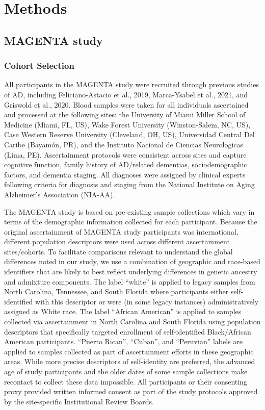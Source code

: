 \section{Methods}


\subsection{MAGENTA study}
\subsubsection*{Cohort Selection}
All participants in the MAGENTA study were recruited through previous studies of AD, including Feliciano-Astacio et al., 2019, Marca-Ysabel et al., 2021, and Griswold et al., 2020. Blood samples were taken for all individuals ascertained and processed at the following sites: the University of Miami Miller School of Medicine (Miami, FL, US), Wake Forest University (Winston-Salem, NC, US), Case Western Reserve University (Cleveland, OH, US), Universidad Central Del Caribe (Bayamón, PR), and the Instituto Nacional de Ciencias Neurologicas (Lima, PE). Ascertainment protocols were consistent across sites and capture cognitive function, family history of AD/related dementias, sociodemographic factors, and dementia staging. All diagnoses were assigned by clinical experts following criteria for diagnosis and staging from the National Institute on Aging Alzheimer's Association (NIA-AA).

The MAGENTA study is based on pre-existing sample collections which vary in terms of the demographic information collected for each participant.  Because the original ascertainment of MAGENTA study participants was international, different population descriptors were used across different ascertainment sites/cohorts. To facilitate comparisons relevant to understand the global differences noted in our study, we use a combination of geographic and race-based identifiers that are likely to best reflect underlying differences in genetic ancestry and admixture components. The label ``white'' is applied to legacy samples from North Carolina, Tennessee, and South Florida where participants either self-identified with this descriptor or were (in some legacy instances) administratively assigned as White race. The label ``African American'' is applied to samples collected via ascertainment in North Carolina and South Florida using population descriptors that specifically targeted enrollment of self-identified Black/African American participants. ``Puerto Rican'', ``Cuban'', and ``Peruvian'' labels are applied to samples collected as part of ascertainment efforts in these geographic areas.  While more precise descriptors of self-identity are preferred, the advanced age of study participants and the older dates of some sample collections make recontact to collect these data impossible.  All participants or their consenting proxy provided written informed consent as part of the study protocols approved by the site-specific Institutional Review Boards.


